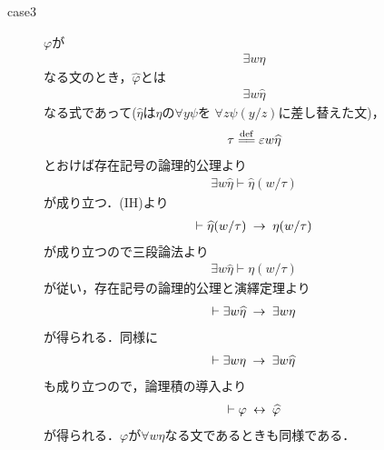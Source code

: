 \begin{sketch}
\begin{description}
\begin{description}
				\item[case3] $\varphi$が
					\begin{align}
						\exists w \eta
					\end{align}
					なる文のとき，$\widehat{\varphi}$とは
					\begin{align}
						\exists w \widehat{\eta}
					\end{align}
					なる式であって($\widehat{\eta}$は$\eta$の$\forall y \psi$を
					$\forall z \psi(y/z)$に差し替えた文)，
					\begin{align}
						\tau \defeq \varepsilon w \widehat{\eta}
					\end{align}
					とおけば存在記号の論理的公理より
					\begin{align}
						\exists w \widehat{\eta} \vdash \widehat{\eta}(w/\tau)
					\end{align}
					が成り立つ．(IH)より
					\begin{align}
						\vdash \widehat{\eta}(w/\tau) \hspace{0.25em}\rightarrow\hspace{0.25em} \eta(w/\tau)
					\end{align}
					が成り立つので三段論法より
					\begin{align}
						\exists w \widehat{\eta} \vdash \eta(w/\tau)
					\end{align}
					が従い，存在記号の論理的公理と演繹定理より
					\begin{align}
						\vdash \exists w \widehat{\eta} \hspace{0.25em}\rightarrow\hspace{0.25em} \exists w \eta
					\end{align}
					が得られる．同様に
					\begin{align}
						\vdash \exists w \eta \hspace{0.25em}\rightarrow\hspace{0.25em} \exists w \widehat{\eta}
					\end{align}
					も成り立つので，論理積の導入より
					\begin{align}
						\vdash \varphi \hspace{0.25em}\leftrightarrow\hspace{0.25em} \widehat{\varphi}
					\end{align}
					が得られる．$\varphi$が$\forall w \eta$なる文であるときも同様である．
					\QED
					

\end{description}
\end{description}
\end{sketch}
